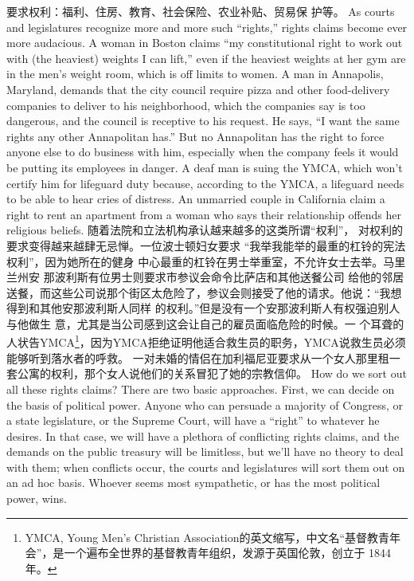 \begin{paracol}{2}
要求权利：福利、住房、教育、社会保险、农业补贴、贸易保
护等。
\switchcolumn*
As courts and legislatures recognize more and more such
``rights,'' rights claims become ever more audacious. A woman
in Boston claims ``my constitutional right to work out with (the
heaviest) weights I can lift,'' even if the heaviest weights at her
gym are in the men's weight room, which is off limits to
women. A man in Annapolis, Maryland, demands that the city
council require pizza and other food-delivery companies to deliver to his neighborhood, which the companies say is too dangerous, and the council is receptive to his request. He says, ``I
want the same rights any other Annapolitan has.'' But no Annapolitan has the right to force anyone else to do business with
him, especially when the company feels it would be putting its
employees in danger. A deaf man is suing the YMCA, which
won't certify him for lifeguard duty because, according to the
YMCA, a lifeguard needs to be able to hear cries of distress. An
unmarried couple in California claim a right to rent an apartment from a woman who says their relationship offends her religious beliefs.
\switchcolumn
随着法院和立法机构承认越来越多的这类所谓“权利”，
对权利的要求变得越来越肆无忌惮。一位波士顿妇女要求
“我举我能举的最重的杠铃的宪法权利”，因为她所在的健身
中心最重的杠铃在男士举重室，不允许女士去举。马里兰州安
那波利斯有位男士则要求市参议会命令比萨店和其他送餐公司
给他的邻居送餐，而这些公司说那个街区太危险了，参议会则接受了他的请求。他说：“我想得到和其他安那波利斯人同样
的权利。”但是没有一个安那波利斯人有权强迫别人与他做生
意，尤其是当公司感到这会让自己的雇员面临危险的时候。一
个耳聋的人状告YMCA\footnote{YMCA, Young Men's Christian Association的英文缩写，中文名“基督教青年会”，是一个遍布全世界的基督教青年组织，发源于英国伦敦，创立于 1844年。}，因为YMCA拒绝证明他适合救生员的职务，YMCA说救生员必须能够听到落水者的呼救。 一对未婚的情侣在加利福尼亚要求从一个女人那里租一套公寓的权利，那个女人说他们的关系冒犯了她的宗教信仰。
\switchcolumn*
How do we sort out all these rights claims? There are two
basic approaches. First, we can decide on the basis of political power. Anyone who can persuade a majority of Congress, or a
state legislature, or the Supreme Court, will have a ``right'' to
whatever he desires. In that case, we will have a plethora of conflicting rights claims, and the demands on the public treasury
will be limitless, but we'll have no theory to deal with them;
when conflicts occur, the courts and legislatures will sort them
out on an ad hoc basis. Whoever seems most sympathetic, or
has the most political power, wins.
\switchcolumn

\end{paracol}
